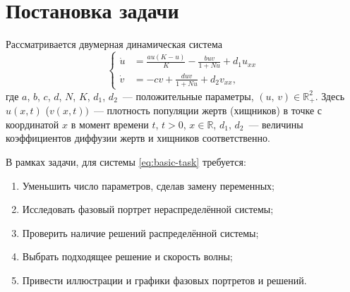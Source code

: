 \documentclass[a4paper, 11pt]{article}
\newcommand{\R}{\mathbb{R}}
\begin{document}
	
	\tableofcontents
	\clearpage
	
	\section{Постановка задачи}
	Рассматривается двумерная динамическая система
	\begin{equation}\label{eq:basic-task}
		\left\{\begin{aligned}
			\dot u &= \frac{au(K - u)}{K} - \frac{buv}{1+Nu} + d_1 u_{xx} \\
			\dot v &= -cv + \frac{duv}{1 + Nu} +d_2 v_{xx},
		\end{aligned}\right.
	\end{equation}
	где $a$, $b$, $c$, $d$, $N$, $K$, $d_1$, $d_2$~--- положительные параметры, $(u,\,v) \in \R^2_{+}$.
	Здесь $u(x,t)$ ($v(x,t))$~--- плотность популяции жертв (хищников) в точке с координатой $x$ в момент времени $t$, $t > 0$, $x \in \R$, $d_1,\,d_2$~--- величины коэффициентов диффузии жертв и хищников соответственно.

	В рамках задачи, для системы \eqref{eq:basic-task} требуется:
	\begin{enumerate}
		\item Уменьшить число параметров, сделав замену переменных;
		\item Исследовать фазовый портрет нераспределённой системы;
		\item Проверить наличие решений распределённой системы;
		\item Выбрать подходящее решение и скорость волны;
		\item Привести иллюстрации и графики фазовых портретов и решений.
	\end{enumerate}
\end{document}
